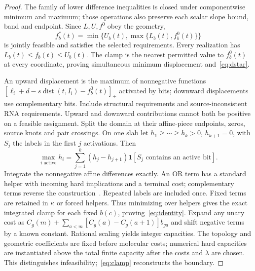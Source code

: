 \documentclass[10pt,letterpaper]{article}
\newcommand{\ind}{\mathbf 1}
\newcommand{\dist}{\operatorname{dist}}
\begin{document}
\begin{proof}
The family of lower difference inequalities is closed under componentwise minimum and maximum; those operations also preserve each scalar slope bound, band and endpoint. Since $L,U,f^0$ obey the geometry,
\begin{equation}
f_b^*(t)=\min\{U_b(t),\max\{L_b(t),f_b^0(t)\}\}\label{eq:clamp}
\end{equation}
is jointly feasible and satisfies the selected requirements. Every realization has $L_b(t)\le f_b(t)\le U_b(t)$. The clamp is the nearest permitted value to $f_b^0(t)$ at every coordinate, proving simultaneous minimum displacement and~\eqref{eq:dstar}.

An upward displacement is the maximum of nonnegative functions $[\ell_i+d-s\dist(t,I_i)-f_b^0(t)]_+$ activated by bits; downward displacements use complementary bits. Include structural requirements and source-inconsistent RNA requirements. Upward and downward contributions cannot both be positive on a feasible assignment. Split the domain at their affine-piece endpoints, zeros, source knots and pair crossings. On one slab let $h_1\ge\cdots\ge h_k>0$, $h_{k+1}=0$, with $S_j$ the labels in the first $j$ activations. Then
\begin{equation}
\max_{i\text{ active}}h_i=\sum_{j=1}^k(h_j-h_{j+1})\ind[S_j\text{ contains an active bit}].\label{eq:layers}
\end{equation}
Integrate the nonnegative affine differences exactly. An OR term has a standard helper with incoming hard implications and a terminal cost; complementary terms reverse the construction~\cite{kz,kohli}. Repeated labels are included once. Fixed terms are retained in $\kappa$ or forced helpers. Thus minimizing over helpers gives the exact integrated clamp for each fixed $b(c)$, proving~\eqref{eq:identity}. Expand any unary cost as $C_g(m)+\sum_{a<m}[C_g(a)-C_g(a+1)]b_{ga}$ and shift negative terms by a known constant. Rational scaling yields integer capacities. The topology and geometric coefficients are fixed before molecular costs; numerical hard capacities are instantiated above the total finite capacity after the costs and $\lambda$ are chosen. This distinguishes infeasibility;~\eqref{eq:clamp} reconstructs the boundary.
\end{proof}
\end{document}

